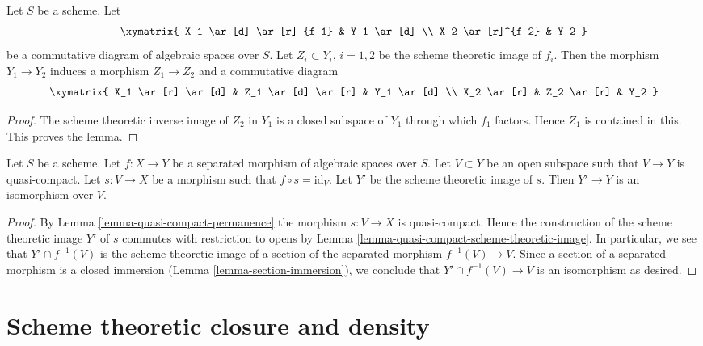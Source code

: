 \begin{lemma}
\label{lemma-factor-factor}
Let $S$ be a scheme. Let
$$
\xymatrix{
X_1 \ar[d] \ar[r]_{f_1} & Y_1 \ar[d] \\
X_2 \ar[r]^{f_2} & Y_2
}
$$
be a commutative diagram of algebraic spaces over $S$.
Let $Z_i \subset Y_i$, $i = 1, 2$ be
the scheme theoretic image of $f_i$. Then the morphism
$Y_1 \to Y_2$ induces a morphism $Z_1 \to Z_2$ and a
commutative diagram
$$
\xymatrix{
X_1 \ar[r] \ar[d] & Z_1 \ar[d] \ar[r] & Y_1 \ar[d] \\
X_2 \ar[r] & Z_2 \ar[r] & Y_2
}
$$
\end{lemma}

\begin{proof}
The scheme theoretic inverse image of $Z_2$ in $Y_1$
is a closed subspace of $Y_1$ through
which $f_1$ factors. Hence $Z_1$ is contained in this.
This proves the lemma.
\end{proof}

\begin{lemma}
\label{lemma-scheme-theoretic-image-of-partial-section}
Let $S$ be a scheme.
Let $f : X \to Y$ be a separated morphism of algebraic spaces over $S$.
Let $V \subset Y$ be an open subspace such that $V \to Y$ is quasi-compact.
Let $s : V \to X$ be a morphism such that $f \circ s = \text{id}_V$.
Let $Y'$ be the scheme theoretic image of $s$.
Then $Y' \to Y$ is an isomorphism over $V$.
\end{lemma}

\begin{proof}
By Lemma \ref{lemma-quasi-compact-permanence}
the morphism $s : V \to X$ is quasi-compact.
Hence the construction of the scheme theoretic image $Y'$
of $s$ commutes with restriction to opens by
Lemma \ref{lemma-quasi-compact-scheme-theoretic-image}.
In particular, we see that $Y' \cap f^{-1}(V)$ is the
scheme theoretic image of a section of the separated
morphism $f^{-1}(V) \to V$. Since a section of a separated
morphism is a closed immersion
(Lemma \ref{lemma-section-immersion}),
we conclude that
$Y' \cap f^{-1}(V) \to V$ is an isomorphism as desired.
\end{proof}








\section{Scheme theoretic closure and density}
\label{section-scheme-theoretic-closure}

